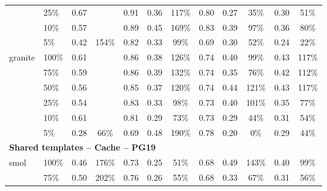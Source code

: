 \begin{longtable}{llcccccccccc}
 & 25\% & 0.67 & \cellcolor{tablegreen!87}\textcolor{white}{304\%} & 0.91 & 0.36 & \cellcolor{tablegreen!33}117\% & 0.80 & 0.27 & \cellcolor{tablegreen!10}35\% & 0.30 & \cellcolor{tablegreen!15}51\% \\
 & 10\% & 0.57 & \cellcolor{tablegreen!68}\textcolor{white}{239\%} & 0.89 & 0.45 & \cellcolor{tablegreen!48}169\% & 0.83 & 0.39 & \cellcolor{tablegreen!28}97\% & 0.36 & \cellcolor{tablegreen!23}80\% \\
 & 5\% & 0.42 & \cellcolor{tablegreen!44}154\% & 0.82 & 0.33 & \cellcolor{tablegreen!28}99\% & 0.69 & 0.30 & \cellcolor{tablegreen!15}52\% & 0.24 & \cellcolor{tablegreen!6}22\% \\
\cmidrule(l){1-12}
\multirow{6}{*}{granite} & 100\% & 0.61 & \cellcolor{tablegreen!76}\textcolor{white}{265\%} & 0.86 & 0.38 & \cellcolor{tablegreen!36}126\% & 0.74 & 0.40 & \cellcolor{tablegreen!28}99\% & 0.43 & \cellcolor{tablegreen!33}117\% \\
 & 75\% & 0.59 & \cellcolor{tablegreen!72}\textcolor{white}{252\%} & 0.86 & 0.39 & \cellcolor{tablegreen!38}132\% & 0.74 & 0.35 & \cellcolor{tablegreen!22}76\% & 0.42 & \cellcolor{tablegreen!32}112\% \\
 & 50\% & 0.56 & \cellcolor{tablegreen!67}\textcolor{white}{234\%} & 0.85 & 0.37 & \cellcolor{tablegreen!34}120\% & 0.74 & 0.44 & \cellcolor{tablegreen!35}121\% & 0.43 & \cellcolor{tablegreen!33}117\% \\
 & 25\% & 0.54 & \cellcolor{tablegreen!64}\textcolor{white}{224\%} & 0.83 & 0.33 & \cellcolor{tablegreen!28}98\% & 0.73 & 0.40 & \cellcolor{tablegreen!29}101\% & 0.35 & \cellcolor{tablegreen!22}77\% \\
 & 10\% & 0.61 & \cellcolor{tablegreen!77}\textcolor{white}{268\%} & 0.81 & 0.29 & \cellcolor{tablegreen!21}73\% & 0.73 & 0.29 & \cellcolor{tablegreen!13}44\% & 0.31 & \cellcolor{tablegreen!15}54\% \\
 & 5\% & 0.28 & \cellcolor{tablegreen!19}66\% & 0.69 & 0.48 & \cellcolor{tablegreen!54}190\% & 0.78 & 0.20 & \cellcolor{tablegreen!0}0\% & 0.29 & \cellcolor{tablegreen!13}44\% \\
\midrule
\multicolumn{12}{l}{\textbf{Shared templates -- Cache -- PG19}} \\
\multirow{6}{*}{smol} & 100\% & 0.46 & \cellcolor{tablegreen!50}176\% & 0.73 & 0.25 & \cellcolor{tablegreen!14}51\% & 0.68 & 0.49 & \cellcolor{tablegreen!41}143\% & 0.40 & \cellcolor{tablegreen!28}99\% \\
 & 75\% & 0.50 & \cellcolor{tablegreen!58}202\% & 0.76 & 0.26 & \cellcolor{tablegreen!16}55\% & 0.68 & 0.33 & \cellcolor{tablegreen!19}67\% & 0.31 & \cellcolor{tablegreen!16}56\% \\

\end{longtable}
